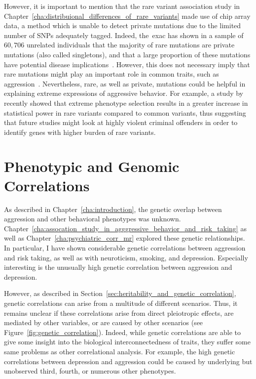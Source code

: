 However, it is important to mention that the rare variant association study in Chapter~\ref{cha:distribuional_differences_of_rare_variants} made use of chip array data, a method which is unable to detect private mutations due to the limited number of SNPs adequately tagged.
Indeed, the~\acrfull{exac} has shown in a sample of $60,706$ unrelated individuals that the majority of rare mutations are private mutations (also called singletons), and that a large proportion of these mutations have potential disease implications~\cite{Lek2016,Kobayashi2017}.
However, this does not necessary imply that rare mutations might play an important role in common traits, such as aggression~\cite{Chabris2015}.
Nevertheless, rare, as well as private, mutations could be helpful in explaining extreme expressions of aggressive behavior.
For example, a study by~\cite{Peloso2016} recently showed that extreme phenotype selection results in a greater increase in statistical power in rare variants compared to common variants,
thus suggesting that future studies might look at highly violent criminal offenders in order to identify genes with higher burden of rare variants.

\section{Phenotypic and Genomic Correlations}
\label{sec:phenotypical_and_genomic_correlations}

As described in Chapter~\ref{cha:introduction}, the genetic overlap between aggression and other behavioral phenotypes was unknown.
Chapter~\ref{cha:assocation_study_in_agggressive_behavior_and_risk_taking} as well as Chapter~\ref{cha:psychiatric_corr_mr} explored these genetic relationships.
In particular, I have shown considerable genetic correlations between aggression and risk taking, as well as with neuroticism, smoking, and depression. 
Especially interesting is the unusually high genetic correlation between aggression and depression.

However, as described in Section~\ref{sec:heritability_and_genetic_correlation}, genetic correlations can arise from a multitude of different scenarios.
Thus, it remains unclear if these correlations arise from direct pleiotropic effects, are mediated by other variables, or are caused by other scenarios (see Figure~\ref{fig:genetic_correlation}). 
Indeed, while genetic correlations are able to give some insight into the biological interconnectedness of traits, they suffer some same problems as other correlational analysis. 
For example, the high genetic correlations between depression and aggression could be caused by underlying but unobserved third, fourth, or numerous other phenotypes.

